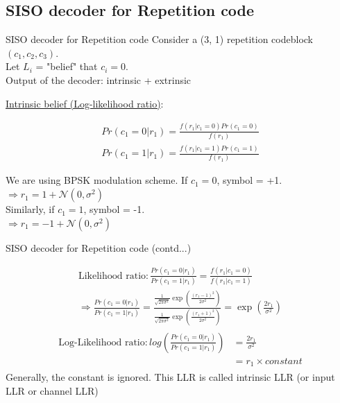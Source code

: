 \subsection{SISO decoder for Repetition code} 
\begin{frame}{SISO decoder for Repetition code}
Consider a (3, 1) repetition codeblock $(c_1, c_2, c_3)$.\\
Let $L_i$ = "belief" that $c_i = 0$. \\
Output of the decoder: intrinsic + extrinsic \\
\begin{block}{\underline{Intrinsic belief (Log-likelihood ratio)}:}
\end{block}
\begin{gather*}
    Pr(c_1 = 0 | r_1) = \frac{f(r_1|c_1 = 0) Pr(c_1 = 0)}{f(r_1)} \\
    Pr(c_1 = 1 | r_1) = \frac{f(r_1|c_1 = 1) Pr(c_1 = 1)}{f(r_1)}
\end{gather*}

We are using BPSK modulation scheme.  If $ c_1 = 0$, symbol = +1. \\ $ \Rightarrow r_1 = 1 + \mathcal{N}(0, \sigma ^2)$ \\
Similarly, if $ c_1 = 1$, symbol = -1. \\ $ \Rightarrow r_1 = -1 + \mathcal{N}(0, \sigma ^2)$
\end{frame}
\begin{frame}{SISO decoder for Repetition code (contd...)}

\begin{gather*}
\text{Likelihood ratio} : \frac{Pr(c_1 = 0|r_1)}{Pr(c_1 = 1|r_1)} =  \frac{f(r_1|c_1 = 0)}{f(r_1|c_1 = 1)} \\
\Rightarrow \frac{Pr(c_1 = 0|r_1)}{Pr(c_1 = 1|r_1)} = \frac{\frac{1}{\sqrt{2 \pi \sigma ^ 2}} \exp(\frac{{(r_1-1)}^2}{2 \sigma ^2})}{\frac{1}{\sqrt{2 \pi \sigma ^ 2}} \exp(\frac{{(r_1+1)}^2}{2 \sigma ^2})}
= \exp({\frac{2r_1}{\sigma ^2}})
\end{gather*}
\begin{gather*}
\begin{split}
\text{Log-Likelihood ratio} :log \left(\frac{Pr(c_1 = 0|r_1)}{Pr(c_1 = 1|r_1)} \right) & = \frac{2r_1}{\sigma ^2} \\
& = r_1 \times constant
\end{split}
\end{gather*}
Generally, the constant is ignored. This LLR is called intrinsic LLR (or input LLR or channel LLR) 
\end{frame}

